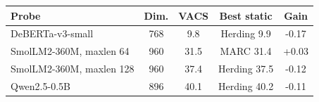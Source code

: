 \begin{tabular}{lcccc}
\toprule
Probe & Dim. & VACS & Best static & Gain \\
\midrule
DeBERTa-v3-small & 768 & 9.8 & Herding 9.9 & -0.17 \\
SmolLM2-360M, maxlen 64 & 960 & 31.5 & MARC 31.4 & +0.03 \\
SmolLM2-360M, maxlen 128 & 960 & 37.4 & Herding 37.5 & -0.12 \\
Qwen2.5-0.5B & 896 & 40.1 & Herding 40.2 & -0.11 \\
\bottomrule
\end{tabular}
